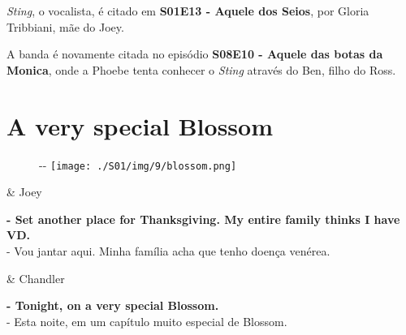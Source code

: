 \emph{Sting}, o vocalista, é citado em
\textbf{\textcolor{primarycolor}{S01E13 - Aquele dos Seios}}, por Gloria
Tribbiani, mãe do Joey.

A banda é novamente citada no episódio
\textbf{\textcolor{primarycolor}{S08E10 - Aquele das botas da Monica}},
onde a Phoebe tenta conhecer o \emph{Sting} através do Ben, filho do
Ross.

\hypertarget{a-very-special-blossom}{%
\section{A very special Blossom}\label{a-very-special-blossom}}

\begin{figure}[!ht]
  \begin{adjustwidth}{-\oddsidemargin-1in}{-\rightmargin}
    \centering
    \texttt{[image: ./S01/img/9/blossom.png]}
  \end{adjustwidth}
\end{figure}

\begin{tcolorbox}[enhanced,center upper,
    drop fuzzy shadow southeast, boxrule=0.3pt,
    lower separated=false, breakable,
    colframe=black!30!dialogoBorder,colback=white]
\begin{minipage}[c]{0.16\linewidth}
   & \centering \scriptsize{Joey}
\end{minipage}
\hfill
\begin{minipage}[c]{0.8\linewidth}
  \textbf{- Set another place for Thanksgiving. My entire family thinks I have VD.}\\
  - Vou jantar aqui. Minha família acha que tenho doença venérea.
\end{minipage}

\medskip
\begin{minipage}[c]{0.16\linewidth}
   & \centering \scriptsize{Chandler}
\end{minipage}
\hfill
\begin{minipage}[c]{0.8\linewidth}
  \textbf{- Tonight, on a very special Blossom.}\\
  - Esta noite, em um capítulo muito especial de Blossom.
\end{minipage}
\end{tcolorbox}

